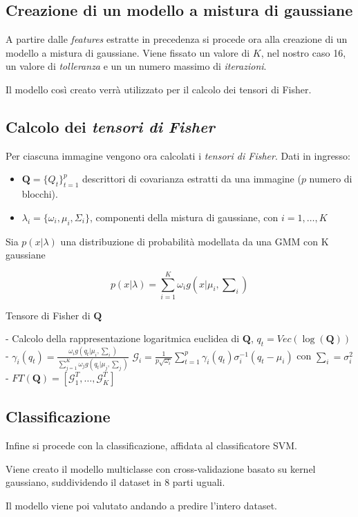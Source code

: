 \subsection{Creazione di un modello a mistura di gaussiane}

A partire dalle \emph{features} estratte in precedenza si procede ora alla creazione di un modello a mistura di gaussiane. Viene fissato un valore di $K$, nel nostro caso 16, un valore di \emph{tolleranza} e un un numero massimo di \emph{iterazioni}.

Il modello così creato verrà utilizzato per il calcolo dei tensori di Fisher.

\subsection{Calcolo dei \emph{tensori di Fisher}}

Per ciascuna immagine vengono ora calcolati i \emph{tensori di Fisher}. Dati in ingresso:
\begin{itemize}
\item $\mathbf{Q} = \{ Q_t \}_{t = 1}^{p}$ descrittori di covarianza estratti da una immagine ($p$ numero di blocchi).
\item $\lambda_i = \{\omega_i, \mu_i, \Sigma_i\}$, componenti della mistura di gaussiane, con $i = 1, \ldots, K$
\end{itemize}

Sia $p(x| \lambda)$ una distribuzione di probabilità modellata da una GMM con K gaussiane

$$p(x | \lambda) = \sum_{i = 1}^{K} \omega_i g(x | \mu_i, \mathcal{\sum}_i)$$

\begin{algorithm}[H]
\caption{Tensore di Fisher di $\mathbf{Q}$}
\begin{algorithmic}
\State - Calcolo della rappresentazione logaritmica euclidea di $\mathbf{Q}$, $q_t = Vec(\log(\mathbf{Q}))$
\State - $\gamma_i(q_t) = \frac{\omega_i g(q_t | \mu_i, \sum_i)}{\sum_{j=1}^{K} \omega_j g(q_t | \mu_j , \sum_j)}$
\State $\mathcal{G}_i = \frac{1}{p\sqrt{\omega_i}} \sum_{t = 1}^{p} \gamma_i(q_t) \sigma_{i}^{-1} (q_t - \mu_i) $ con $\sum_i = \sigma_{i}^{2}$
\EndFor
\State - $FT(\mathbf{Q}) = [\mathcal{G}_{1}^T, \ldots, \mathcal{G}_{K}^T]$
\end{algorithmic}
\end{algorithm}

\subsection{Classificazione}

Infine si procede con la classificazione, affidata al classificatore SVM. 

Viene creato il modello multiclasse con cross-validazione basato su kernel gaussiano, suddividendo il dataset in 8 parti uguali. 

Il modello viene poi valutato andando a predire l'intero dataset.